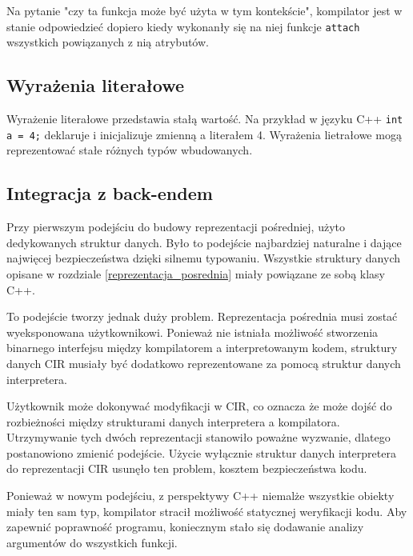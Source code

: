 Na pytanie "czy ta funkcja może być użyta w tym kontekście", kompilator jest w stanie odpowiedzieć dopiero kiedy wykonanły się na niej funkcje \lstinline{attach} wszystkich powiązanych z nią atrybutów.


\subsection{Wyrażenia literałowe}

Wyrażenie literałowe przedstawia stałą wartość.
Na przykład w języku C++ \lstinline{int a = 4;} deklaruje i inicjalizuje zmienną a literałem 4.
Wyrażenia lietrałowe mogą reprezentować stałe różnych typów wbudowanych.

\subsection{Integracja z back-endem}
\label{backend_integration}
Przy pierwszym podejściu do budowy reprezentacji pośredniej, użyto dedykowanych struktur danych. Było to podejście najbardziej naturalne i dające najwięcej bezpieczeństwa dzięki silnemu typowaniu. Wszystkie struktury danych opisane w rozdziale \ref{reprezentacja_posrednia} miały powiązane ze sobą klasy C++.


To podejście tworzy jednak duży problem. Reprezentacja pośrednia musi zostać wyeksponowana użytkownikowi. Ponieważ nie istniała możliwość stworzenia binarnego interfejsu między kompilatorem a interpretowanym kodem, struktury danych CIR musiały być dodatkowo reprezentowane za pomocą struktur danych interpretera.


Użytkownik może dokonywać modyfikacji w CIR, co oznacza że może dojść do rozbieżności między strukturami danych interpretera a kompilatora. Utrzymywanie tych dwóch reprezentacji stanowiło poważne wyzwanie, dlatego postanowiono zmienić podejście. Użycie wyłącznie struktur danych interpretera do reprezentacji CIR usunęło ten problem, kosztem bezpieczeństwa kodu.


Ponieważ w nowym podejściu, z perspektywy C++ niemalże wszystkie obiekty miały ten sam typ, kompilator stracił możliwość statycznej weryfikacji kodu.
Aby zapewnić poprawność programu, koniecznym stało się dodawanie analizy argumentów do wszystkich funkcji.
